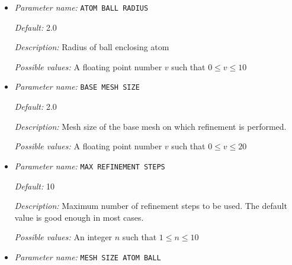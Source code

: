 \begin{itemize}
\item {\it Parameter name:} {\tt ATOM BALL RADIUS}
\label{parameters:Finite element mesh parameters/Auto mesh generation parameters/ATOM BALL RADIUS}
\label{parameters:Finite_20element_20mesh_20parameters/Auto_20mesh_20generation_20parameters/ATOM_20BALL_20RADIUS}


{\it Default:} 2.0


{\it Description:} Radius of ball enclosing atom


{\it Possible values:} A floating point number $v$ such that $0 \leq v \leq 10$
\item {\it Parameter name:} {\tt BASE MESH SIZE}
\label{parameters:Finite element mesh parameters/Auto mesh generation parameters/BASE MESH SIZE}
\label{parameters:Finite_20element_20mesh_20parameters/Auto_20mesh_20generation_20parameters/BASE_20MESH_20SIZE}


{\it Default:} 2.0


{\it Description:} Mesh size of the base mesh on which refinement is performed.


{\it Possible values:} A floating point number $v$ such that $0 \leq v \leq 20$
\item {\it Parameter name:} {\tt MAX REFINEMENT STEPS}
\label{parameters:Finite element mesh parameters/Auto mesh generation parameters/MAX REFINEMENT STEPS}
\label{parameters:Finite_20element_20mesh_20parameters/Auto_20mesh_20generation_20parameters/MAX_20REFINEMENT_20STEPS}


{\it Default:} 10


{\it Description:} Maximum number of refinement steps to be used. The default value is good enough in most cases.


{\it Possible values:} An integer $n$ such that $1\leq n \leq 10$
\item {\it Parameter name:} {\tt MESH SIZE ATOM BALL}
\label{parameters:Finite element mesh parameters/Auto mesh generation parameters/MESH SIZE ATOM BALL}
\label{parameters:Finite_20element_20mesh_20parameters/Auto_20mesh_20generation_20parameters/MESH_20SIZE_20ATOM_20BALL}



\end{itemize}
